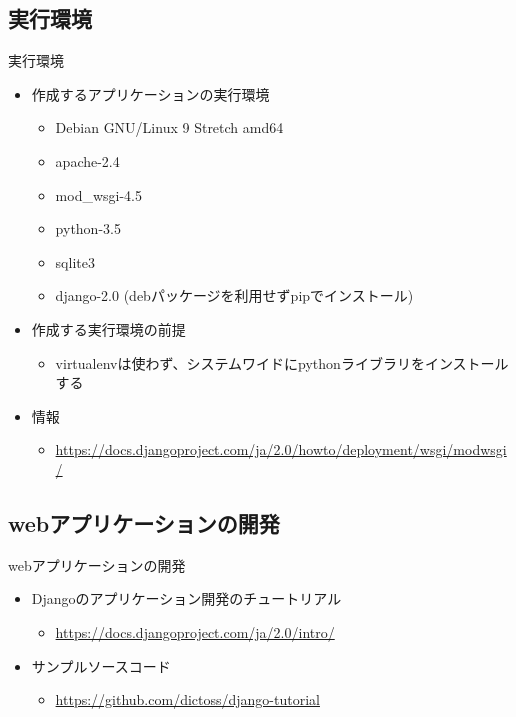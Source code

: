 \subsection{実行環境}

\begin{frame}{実行環境}%

\begin{itemize}
\item 作成するアプリケーションの実行環境
  \begin{itemize}
    \item Debian GNU/Linux 9 Stretch amd64
    \item apache-2.4
    \item mod\_wsgi-4.5
    \item python-3.5
    \item sqlite3
    \item django-2.0 (debパッケージを利用せずpipでインストール)
  \end{itemize}
\item 作成する実行環境の前提
  \begin{itemize}
  \item virtualenvは使わず、システムワイドにpythonライブラリをインストールする
  \end{itemize}
\item 情報
  \begin{itemize}
  \item \url{https://docs.djangoproject.com/ja/2.0/howto/deployment/wsgi/modwsgi/}
  \end{itemize}
\end{itemize}

\end{frame}


\subsection{webアプリケーションの開発}

\begin{frame}[containsverbatim]{webアプリケーションの開発}

\begin{itemize}
\item Djangoのアプリケーション開発のチュートリアル
  \begin{itemize}
  \item \url{https://docs.djangoproject.com/ja/2.0/intro/}
  \end{itemize}
\item サンプルソースコード
  \begin{itemize}
  \item \url{https://github.com/dictoss/django-tutorial}
  \end{itemize}
\end{itemize}

\end{frame}


